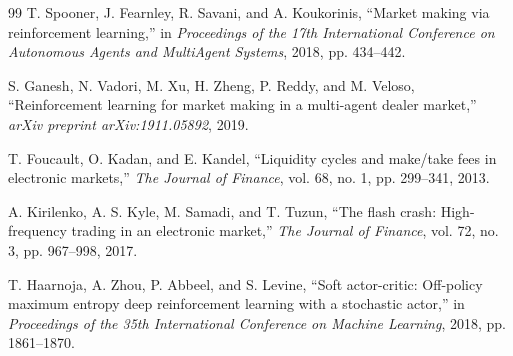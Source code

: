 \documentclass[11pt,a4paper]{article}
\begin{document}
\begin{thebibliography}{99}
T. Spooner, J. Fearnley, R. Savani, and A. Koukorinis, ``Market making via reinforcement learning,'' in \emph{Proceedings of the 17th International Conference on Autonomous Agents and MultiAgent Systems}, 2018, pp. 434--442.

S. Ganesh, N. Vadori, M. Xu, H. Zheng, P. Reddy, and M. Veloso, ``Reinforcement learning for market making in a multi-agent dealer market,'' \emph{arXiv preprint arXiv:1911.05892}, 2019.

T. Foucault, O. Kadan, and E. Kandel, ``Liquidity cycles and make/take fees in electronic markets,'' \emph{The Journal of Finance}, vol. 68, no. 1, pp. 299--341, 2013.

A. Kirilenko, A. S. Kyle, M. Samadi, and T. Tuzun, ``The flash crash: High-frequency trading in an electronic market,'' \emph{The Journal of Finance}, vol. 72, no. 3, pp. 967--998, 2017.

T. Haarnoja, A. Zhou, P. Abbeel, and S. Levine, ``Soft actor-critic: Off-policy maximum entropy deep reinforcement learning with a stochastic actor,'' in \emph{Proceedings of the 35th International Conference on Machine Learning}, 2018, pp. 1861--1870.

\end{thebibliography}
\end{document}
